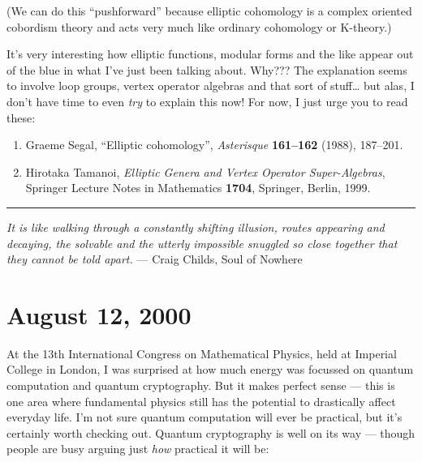 \documentclass{article}
\def\tightlist{}
\renewcommand{\texttt}[1]{%
  \begingroup
  \ttfamily
  \begingroup\lccode`~=`/\lowercase{\endgroup\def~}{/\discretionary{}{}{}}%
  \begingroup\lccode`~=`[\lowercase{\endgroup\def~}{[\discretionary{}{}{}}%
  \begingroup\lccode`~=`.\lowercase{\endgroup\def~}{.\discretionary{}{}{}}%
  \catcode`/=\active\catcode`[=\active\catcode`.=\active
  \scantokens{#1\noexpand}%
  \endgroup
}
\begin{document}
(We can do this ``pushforward'' because elliptic cohomology is a complex
oriented cobordism theory and acts very much like ordinary cohomology or
K-theory.)

It's very interesting how elliptic functions, modular forms and the like
appear out of the blue in what I've just been talking about. Why??? The
explanation seems to involve loop groups, vertex operator algebras and
that sort of stuff\ldots{} but alas, I don't have time to even
\emph{try} to explain this now! For now, I just urge you to read these:

\begin{enumerate}
\def\labelenumi{\arabic{enumi})}
\setcounter{enumi}{6}
\item
  Graeme Segal, ``Elliptic cohomology'', \emph{Asterisque}
  \textbf{161--162} (1988), 187--201.
\item
  Hirotaka Tamanoi, \emph{Elliptic Genera and Vertex Operator
  Super-Algebras}, Springer Lecture Notes in Mathematics \textbf{1704},
  Springer, Berlin, 1999.
\end{enumerate}

\begin{center}\rule{0.5\linewidth}{0.5pt}\end{center}

\emph{It is like walking through a constantly shifting illusion, routes
appearing and decaying, the solvable and the utterly impossible snuggled
so close together that they cannot be told apart.} --- Craig Childs,
Soul of Nowhere



\hypertarget{week154}{%
\section{August 12, 2000}\label{week154}}

At the 13th International Congress on Mathematical Physics, held at
Imperial College in London, I was surprised at how much energy was
focussed on quantum computation and quantum cryptography. But it makes
perfect sense --- this is one area where fundamental physics still has
the potential to drastically affect everyday life. I'm not sure quantum
computation will ever be practical, but it's certainly worth checking
out. Quantum cryptography is well on its way --- though people are busy
arguing just \emph{how} practical it will be:

\end{document}
